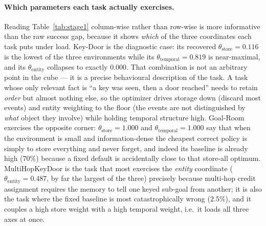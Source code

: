\paragraph{Which parameters each task actually exercises.} Reading
Table~\ref{tab:stage1} column-wise rather than row-wise is more informative than
the raw success gap, because it shows \emph{which} of the three coordinates each
task puts under load. Key-Door is the diagnostic case: its recovered
$\theta_{\mathrm{store}}{=}0.116$ is the lowest of the three environments while
its $\theta_{\mathrm{temporal}}{=}0.819$ is near-maximal, and its
$\theta_{\mathrm{entity}}$ collapses to exactly $0.000$. That combination is not
an arbitrary point in the cube --- it is a precise behavioural description of the
task. A task whose only relevant fact is ``a key was seen, then a door reached''
needs to retain \emph{order} but almost nothing else, so the optimizer drives
storage down (discard most events) and entity weighting to the floor (the events
are not distinguished by \emph{what} object they involve) while holding temporal
structure high. Goal-Room exercises the opposite corner:
$\theta_{\mathrm{store}}{=}1.000$ and $\theta_{\mathrm{temporal}}{=}1.000$ say
that when the environment is small and information-dense the cheapest correct
policy is simply to store everything and never forget, and indeed its baseline is
already high ($70\%$) because a fixed default is accidentally close to that
store-all optimum. MultiHopKeyDoor is the task that most exercises the
\emph{entity} coordinate ($\theta_{\mathrm{entity}}{=}0.487$, by far the largest
of the three) precisely because multi-hop credit assignment requires the memory
to tell one keyed sub-goal from another; it is also the task where the fixed
baseline is most catastrophically wrong ($2.5\%$), and it couples a high store
weight with a high temporal weight, i.e.\ it loads all three axes at once.

